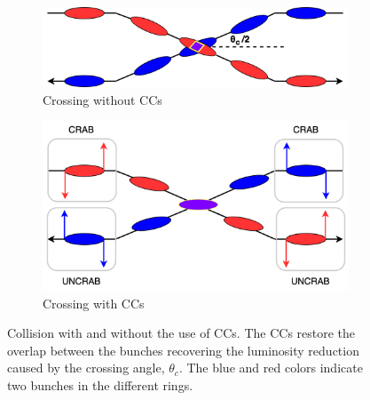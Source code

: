 \begin{figure}[!ht]
    \centering
    \begin{subfigure}[t]{0.45\textwidth}
        \centering
        \includegraphics[width=1\textwidth]{images/introduction/crossing_no_CCs.png}
        \caption{Crossing without CCs}
    \end{subfigure}
    \vfill
    \begin{subfigure}[t]{0.45\textwidth}
        \centering
        \includegraphics[width=1\textwidth]{images/introduction/crossing_CCs.png}
        \caption{Crossing with CCs}
    \end{subfigure}
    \hfill
     \caption{Collision with and without the use of CCs. The %
     CCs restore the overlap between the bunches recovering the luminosity reduction caused by the crossing angle, $\theta_c$. The blue and red colors indicate two bunches in the different rings.} 
     \label{fig:crossing_with_and_without_CCs}
 \end{figure}


